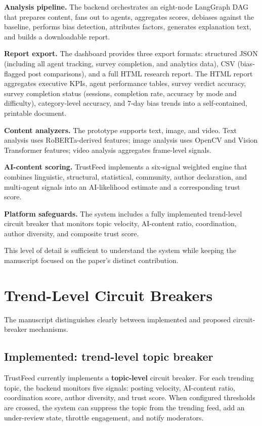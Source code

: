 \documentclass[acmlarge,screen,nonacm]{acmart}
\begin{document}
\textbf{Analysis pipeline.} The backend orchestrates an eight-node LangGraph DAG that prepares content, fans out to agents, aggregates scores, debiases against the baseline, performs bias detection, attributes factors, generates explanation text, and builds a downloadable report.

\textbf{Report export.} The dashboard provides three export formats: structured JSON (including all agent tracking, survey completion, and analytics data), CSV (bias-flagged post comparisons), and a full HTML research report. The HTML report aggregates executive KPIs, agent performance tables, survey verdict accuracy, survey completion status (sessions, completion rate, accuracy by mode and difficulty), category-level accuracy, and 7-day bias trends into a self-contained, printable document.

\textbf{Content analyzers.} The prototype supports text, image, and video. Text analysis uses RoBERTa-derived features; image analysis uses OpenCV and Vision Transformer features; video analysis aggregates frame-level signals.

\textbf{AI-content scoring.} TrustFeed implements a six-signal weighted engine that combines linguistic, structural, statistical, community, author declaration, and multi-agent signals into an AI-likelihood estimate and a corresponding trust score.

\textbf{Platform safeguards.} The system includes a fully implemented trend-level circuit breaker that monitors topic velocity, AI-content ratio, coordination, author diversity, and composite trust score.

This level of detail is sufficient to understand the system while keeping the manuscript focused on the paper's distinct contribution.

\section{Trend-Level Circuit Breakers}

The manuscript distinguishes clearly between implemented and proposed circuit-breaker mechanisms.

\subsection{Implemented: trend-level topic breaker}

TrustFeed currently implements a \textbf{topic-level} circuit breaker. For each trending topic, the backend monitors five signals: posting velocity, AI-content ratio, coordination score, author diversity, and trust score. When configured thresholds are crossed, the system can suppress the topic from the trending feed, add an under-review state, throttle engagement, and notify moderators.
\end{document}
